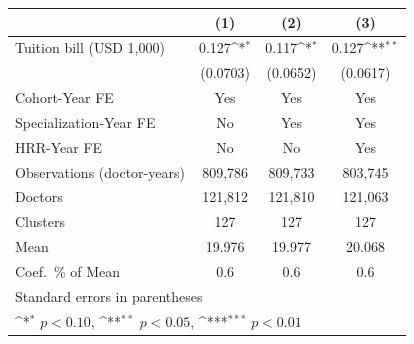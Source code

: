 {
\def\sym#1{\ifmmode^{#1}\else\(^{#1}\)\fi}
\begin{tabular}{l*{3}{c}}
\hline\hline
                    &\multicolumn{1}{c}{(1)}         &\multicolumn{1}{c}{(2)}         &\multicolumn{1}{c}{(3)}         \\
\hline
Tuition bill (USD 1,000)&       0.127\sym{*}  &       0.117\sym{*}  &       0.127\sym{**} \\
                    &    (0.0703)         &    (0.0652)         &    (0.0617)         \\
[1em]
Cohort-Year FE      &         Yes         &         Yes         &         Yes         \\
[1em]
Specialization-Year FE&          No         &         Yes         &         Yes         \\
[1em]
HRR-Year FE         &          No         &          No         &         Yes         \\
\hline
Observations (doctor-years)&     809,786         &     809,733         &     803,745         \\
Doctors             &     121,812         &     121,810         &     121,063         \\
Clusters            &         127         &         127         &         127         \\
Mean                &      19.976         &      19.977         &      20.068         \\
Coef.\ \% of Mean   &         0.6         &         0.6         &         0.6         \\
\hline\hline
\multicolumn{4}{l}{\footnotesize Standard errors in parentheses}\\
\multicolumn{4}{l}{\footnotesize \sym{*} \(p<0.10\), \sym{**} \(p<0.05\), \sym{***} \(p<0.01\)}\\
\end{tabular}
}
